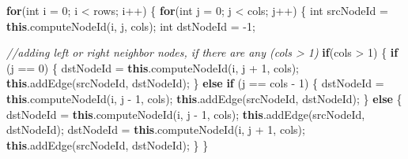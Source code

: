 \documentclass[]{book}
\newenvironment{Shaded}{\begin{snugshade}}{\end{snugshade}}
\newcommand{\CommentTok}[1]{\textcolor[rgb]{0.56,0.35,0.01}{\textit{#1}}}
\newcommand{\DataTypeTok}[1]{\textcolor[rgb]{0.13,0.29,0.53}{#1}}
\newcommand{\DecValTok}[1]{\textcolor[rgb]{0.00,0.00,0.81}{#1}}
\newcommand{\FunctionTok}[1]{\textcolor[rgb]{0.00,0.00,0.00}{#1}}
\newcommand{\KeywordTok}[1]{\textcolor[rgb]{0.13,0.29,0.53}{\textbf{#1}}}
\newcommand{\NormalTok}[1]{#1}
\begin{document}
\begin{Shaded}
\begin{Highlighting}[]
        \KeywordTok{for}\NormalTok{(}\DataTypeTok{int}\NormalTok{ i = }\DecValTok{0}\NormalTok{; i < rows; i++) \{}
            \KeywordTok{for}\NormalTok{(}\DataTypeTok{int}\NormalTok{ j = }\DecValTok{0}\NormalTok{; j < cols; j++) \{}
                \DataTypeTok{int}\NormalTok{ srcNodeId = }\KeywordTok{this}\NormalTok{.}\FunctionTok{computeNodeId}\NormalTok{(i, j, cols);}
                \DataTypeTok{int}\NormalTok{ dstNodeId = }\DecValTok{-1}\NormalTok{;}

                \CommentTok{//adding left or right neighbor nodes, if there are any (cols > 1)}
                \KeywordTok{if}\NormalTok{(cols > }\DecValTok{1}\NormalTok{) \{}
                    \KeywordTok{if}\NormalTok{ (j == }\DecValTok{0}\NormalTok{) \{}
\NormalTok{                        dstNodeId = }\KeywordTok{this}\NormalTok{.}\FunctionTok{computeNodeId}\NormalTok{(i, j + }\DecValTok{1}\NormalTok{, cols);}
                        \KeywordTok{this}\NormalTok{.}\FunctionTok{addEdge}\NormalTok{(srcNodeId, dstNodeId);}
\NormalTok{                    \} }\KeywordTok{else} \KeywordTok{if}\NormalTok{ (j == cols - }\DecValTok{1}\NormalTok{) \{}
\NormalTok{                        dstNodeId = }\KeywordTok{this}\NormalTok{.}\FunctionTok{computeNodeId}\NormalTok{(i, j - }\DecValTok{1}\NormalTok{, cols);}
                        \KeywordTok{this}\NormalTok{.}\FunctionTok{addEdge}\NormalTok{(srcNodeId, dstNodeId);}
\NormalTok{                    \} }\KeywordTok{else}\NormalTok{ \{}
\NormalTok{                        dstNodeId = }\KeywordTok{this}\NormalTok{.}\FunctionTok{computeNodeId}\NormalTok{(i, j - }\DecValTok{1}\NormalTok{, cols);}
                        \KeywordTok{this}\NormalTok{.}\FunctionTok{addEdge}\NormalTok{(srcNodeId, dstNodeId);}
\NormalTok{                        dstNodeId = }\KeywordTok{this}\NormalTok{.}\FunctionTok{computeNodeId}\NormalTok{(i, j + }\DecValTok{1}\NormalTok{, cols);}
                        \KeywordTok{this}\NormalTok{.}\FunctionTok{addEdge}\NormalTok{(srcNodeId, dstNodeId);}
\NormalTok{                    \}}
\NormalTok{                \}}


\end{Highlighting}
\end{Shaded}
\end{document}

